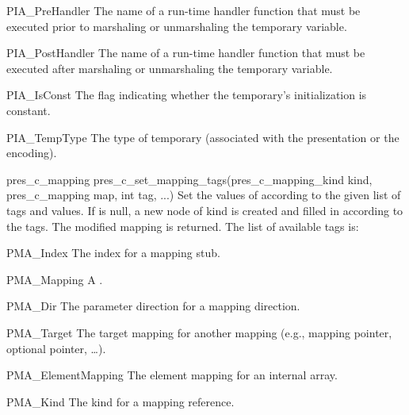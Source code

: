 \begin{cprototypelist}
\begin{cidentifierlist}
    \item[PIA_PreHandler]  The name of a run-time
    handler function that must be executed prior to marshaling or unmarshaling
    the temporary variable.

    \item[PIA_PostHandler]  The name of a
    run-time handler function that must be executed after marshaling or
    unmarshaling the temporary variable.

    \item[PIA_IsConst]  The flag indicating whether
    the temporary's initialization is constant.

    \item[PIA_TempType]  The type
    of temporary (associated with the presentation or the encoding).
  \end{cidentifierlist}

  \item[pres_c_mapping pres_c_set_mapping_tags(pres_c_mapping_kind kind,
  pres_c_mapping map, int tag, ...)]  Set the values of 
  according to the given list of tags and values.  If  is
  null, a new  node of kind  is
  created and filled in according to the tags.  The modified mapping is
  returned.  The list of available tags is:

  \begin{cidentifierlist}
    \item[PMA_Index]  The index for a mapping stub.

    \item[PMA_Mapping]  A
    .

    \item[PMA_Dir]  The parameter
    direction for a mapping direction.

    \item[PMA_Target]  The target mapping for another mapping (e.g., mapping
    pointer, optional pointer, \ldots{}).

    \item[PMA_ElementMapping]  The
    element mapping for an internal array.

    \item[PMA_Kind]  The kind for
    a mapping reference.


\end{cidentifierlist}
\end{cprototypelist}
